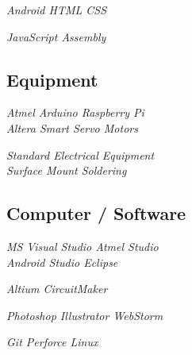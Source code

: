 \documentclass[]{aftab-resume}
\begin{document}
\begin{minipage}[t]{0.33\textwidth}
\it{\textbullet{} Android \textbullet{} HTML \textbullet{} CSS \\}
\vspace{0.05cm}

\it{\textbullet{} JavaScript \textbullet{} Assembly \\}

\sectionsep


\subsection{Equipment}
\vspace{0.01cm}

\it{\textbullet{} Atmel \textbullet{} Arduino \textbullet{} Raspberry Pi \\}
\it{\textbullet{} Altera \textbullet{} Smart Servo Motors \\}
\vspace{0.05cm}

\it{\textbullet{} Standard Electrical Equipment \\}
\it{\textbullet{} Surface Mount Soldering \\}
\sectionsep


\subsection{Computer / Software}
\vspace{0.01cm}

\it{\textbullet{} MS Visual Studio \textbullet{} Atmel Studio \\}
\it{\textbullet{} Android Studio \textbullet{} Eclipse \\}
\vspace{0.075cm}

\it{\textbullet{} Altium \textbullet{} CircuitMaker \\}
\vspace{0.075cm}

\it{\textbullet{} Photoshop \textbullet{} Illustrator \textbullet{} WebStorm \\}
\vspace{0.075cm}

\it{\textbullet{} Git \textbullet{} Perforce \textbullet{} Linux \\}


\end{minipage}
\end{document}
